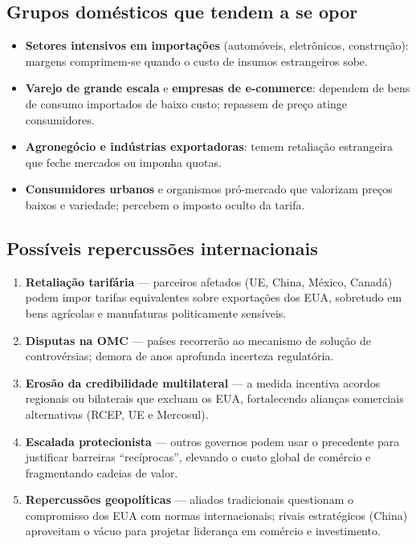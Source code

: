 \documentclass[a4paper,12pt]{article}[abntex2]
\begin{document}
\subsection*{\textbf{Grupos domésticos que tendem a se opor}}

\begin{itemize}
    \item \textbf{Setores intensivos em importações} (automóveis, eletrônicos, construção): margens comprimem-se quando o custo de insumos estrangeiros sobe.  
    \item \textbf{Varejo de grande escala} e \textbf{empresas de e-commerce}: dependem de bens de consumo importados de baixo custo; repassem de preço atinge consumidores.  
    \item \textbf{Agronegócio e indústrias exportadoras}: temem retaliação estrangeira que feche mercados ou imponha quotas.  
    \item \textbf{Consumidores urbanos} e organismos pró-mercado que valorizam preços baixos e variedade; percebem o imposto oculto da tarifa.
\end{itemize}

\subsection*{\textbf{Possíveis repercussões internacionais}}


\begin{enumerate}
    \item \textbf{Retaliação tarifária} — parceiros afetados (UE, China, México, Canadá) podem impor tarifas equivalentes sobre exportações dos EUA, sobretudo em bens agrícolas e manufaturas politicamente sensíveis.  
    \item \textbf{Disputas na OMC} — países recorrerão ao mecanismo de solução de controvérsias; demora de anos aprofunda incerteza regulatória.  
    \item \textbf{Erosão da credibilidade multilateral} — a medida incentiva acordos regionais ou bilaterais que excluam os EUA, fortalecendo alianças comerciais alternativas (RCEP, UE e Mercosul).  
    \item \textbf{Escalada protecionista} — outros governos podem usar o precedente para justificar barreiras “recíprocas”, elevando o custo global de comércio e fragmentando cadeias de valor.  
    \item \textbf{Repercussões geopolíticas} — aliados tradicionais questionam o compromisso dos EUA com normas internacionais; rivais estratégicos (China) aproveitam o vácuo para projetar liderança em comércio e investimento.
\end{enumerate}
\end{document}
